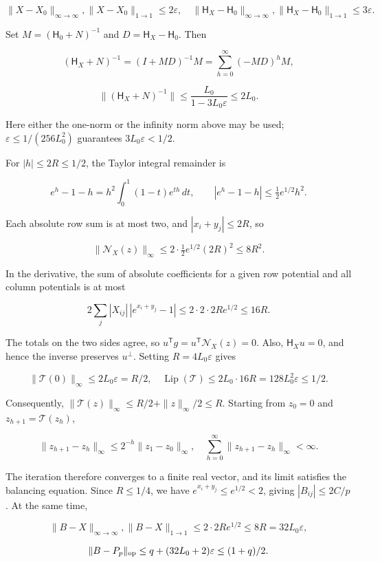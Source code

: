 \documentclass[11pt,a4paper]{article}
\begin{document}
\[
\|X-X_0\|_{\infty\to\infty},\|X-X_0\|_{1\to1}\le2\varepsilon,
\quad\|\mathsf H_X-\mathsf H_0\|_{\infty\to\infty},
\|\mathsf H_X-\mathsf H_0\|_{1\to1}\le3\varepsilon.
\]

Set \(M=(\mathsf H_0+N)^{-1}\) and \(D=\mathsf H_X-\mathsf H_0\). Then

\[
(\mathsf H_X+N)^{-1}=(I+MD)^{-1}M
=\sum_{h=0}^{\infty}(-MD)^hM,
\]

\[
\|(\mathsf H_X+N)^{-1}\|\le\frac{L_0}{1-3L_0\varepsilon}\le2L_0.
\]

Here either the one-norm or the infinity norm above may be used; \(\varepsilon\le1/(256L_0^2)\) guarantees \(3L_0\varepsilon<1/2\).

For \(|h|\le2R\le1/2\), the Taylor integral remainder is

\[
e^h-1-h=h^2\int_0^1(1-t)e^{th}\,dt,
\qquad |e^h-1-h|\le\tfrac12e^{1/2}h^2.
\]

Each absolute row sum is at most two, and \(|x_i+y_j|\le2R\), so

\[
\|\mathcal N_X(z)\|_\infty\le2\cdot\tfrac12e^{1/2}(2R)^2\le8R^2.
\]

In the derivative, the sum of absolute coefficients for a given row potential and all column potentials is at most

\[
2\sum_j|X_{ij}|\,|e^{x_i+y_j}-1|
\le2\cdot2\cdot2Re^{1/2}\le16R.
\]

The totals on the two sides agree, so \(u^{\mathsf T}g=u^{\mathsf T}\mathcal N_X(z)=0\). Also, \(\mathsf H_Xu=0\), and hence the inverse preserves \(u^\perp\). Setting \(R=4L_0\varepsilon\) gives

\[
\|\mathcal T(0)\|_\infty\le2L_0\varepsilon=R/2,
\quad\operatorname{Lip}(\mathcal T)\le2L_0\cdot16R
=128L_0^2\varepsilon\le1/2.
\]

Consequently, \(\|\mathcal T(z)\|_\infty\le R/2+\|z\|_\infty/2\le R\). Starting from \(z_0=0\) and \(z_{h+1}=\mathcal T(z_h)\),

\[
\|z_{h+1}-z_h\|_\infty\le2^{-h}\|z_1-z_0\|_\infty,
\quad\sum_{h=0}^{\infty}\|z_{h+1}-z_h\|_\infty<\infty.
\]

The iteration therefore converges to a finite real vector, and its limit satisfies the balancing equation. Since \(R\le1/4\), we have \(e^{x_i+y_j}\le e^{1/2}<2\), giving \(|B_{ij}|\le2C/p\). At the same time,

\[
\|B-X\|_{\infty\to\infty},\|B-X\|_{1\to1}
\le2\cdot2Re^{1/2}\le8R=32L_0\varepsilon,
\]

\[
\|B-P_p\|_{\rm op}\le q+(32L_0+2)\varepsilon\le(1+q)/2.
\]
\end{document}
